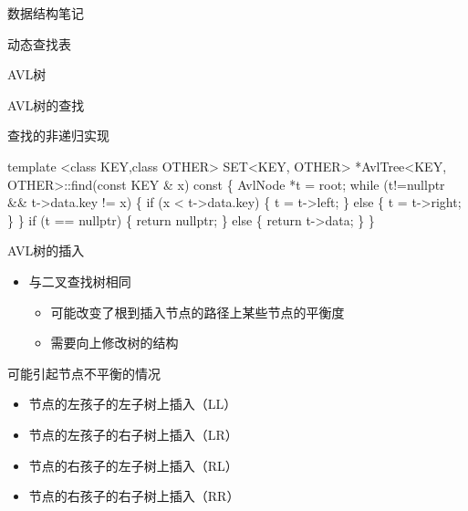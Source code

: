 \documentclass[
  ignorenonframetext,
]{beamer}
\newenvironment{Shaded}{}{}
\newcommand{\NormalTok}[1]{#1}
\providecommand{\tightlist}{%
  \setlength{\itemsep}{0pt}\setlength{\parskip}{0pt}}
\begin{document}
\begin{frame}[fragile]{数据结构笔记}
\begin{block}{动态查找表}
\begin{block}{AVL树}
\begin{block}{AVL树的查找}
\begin{block}{查找的非递归实现}
\begin{Shaded}
\begin{Highlighting}[]
\NormalTok{template \textless{}class KEY,class OTHER\textgreater{}}
\NormalTok{SET\textless{}KEY, OTHER\textgreater{} *AvlTree\textless{}KEY, OTHER\textgreater{}::find(const KEY \& x) const}
\NormalTok{\{}
\NormalTok{  AvlNode *t = root; }
\NormalTok{  while (t!=nullptr \&\& t{-}\textgreater{}data.key != x) }
\NormalTok{  \{}
\NormalTok{    if (x \textless{} t{-}\textgreater{}data.key) }
\NormalTok{    \{}
\NormalTok{      t = t{-}\textgreater{}left;}
\NormalTok{    \}}
\NormalTok{    else}
\NormalTok{    \{}
\NormalTok{      t = t{-}\textgreater{}right;}
\NormalTok{    \}}
\NormalTok{  \}}
\NormalTok{  if (t == nullptr)}
\NormalTok{  \{}
\NormalTok{    return nullptr;}
\NormalTok{  \}}
\NormalTok{  else}
\NormalTok{  \{}
\NormalTok{    return t{-}\textgreater{}data;}
\NormalTok{  \}}
\NormalTok{\}}
\end{Highlighting}
\end{Shaded}
\end{block}
\end{block}

\begin{block}{AVL树的插入}
\protect{}\label{avlux6811ux7684ux63d2ux5165}
\begin{itemize}
\tightlist
\item
  与二叉查找树相同

  \begin{itemize}
  \tightlist
  \item
    可能改变了根到插入节点的路径上某些节点的平衡度
  \item
    需要向上修改树的结构
  \end{itemize}
\end{itemize}

\begin{block}{可能引起节点不平衡的情况}
\protect{}\label{ux53efux80fdux5f15ux8d77ux8282ux70b9ux4e0dux5e73ux8861ux7684ux60c5ux51b5}
\begin{itemize}
\tightlist
\item
  节点的左孩子的左子树上插入（LL）
\item
  节点的左孩子的右子树上插入（LR）
\item
  节点的右孩子的左子树上插入（RL）
\item
  节点的右孩子的右子树上插入（RR）
\end{itemize}
\end{block}


\end{block}
\end{block}
\end{block}
\end{frame}
\end{document}
